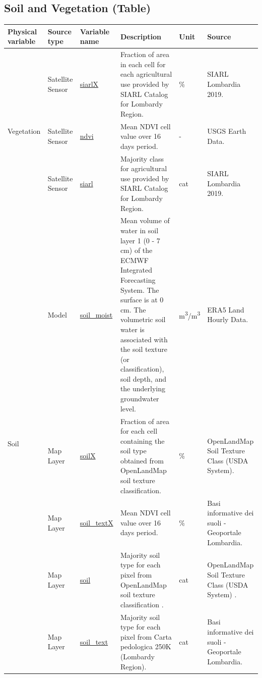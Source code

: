 \subsection{Soil and Vegetation (Table)}

\begin{center}
\setlength{\arrayrulewidth}{1.5pt}
\begin{longtable}{ |p{2cm}|p{1.5cm}|p{2.3cm}|p{4cm}|p{1cm}|p{2cm}| } 
\hline
\textbf{Physical variable} & \textbf{Source type}  & \textbf{Variable name}  & \textbf{Description}  & \textbf{Unit}  & \textbf{Source}\\ 
\hline

\multirow{3}{4em}{Vegetation} & Satellite \newline Sensor  & \underline{siarlX} & Fraction of area in each cell for each agricultural use provided by SIARL Catalog for Lombardy Region.\par & \% & SIARL Lombardia 2019.\\ 
& Satellite \newline Sensor  & \underline{ndvi} &  Mean NDVI cell value over 16 days period.\par & - & USGS Earth Data.\\ 
& Satellite \newline Sensor  & \underline{siarl} &  Majority class for agricultural use provided by SIARL Catalog for Lombardy Region. \par & cat & SIARL Lombardia 2019.\\
\hline

\multirow{5}{4em}{Soil} & Model  & \underline{soil\_moist} & Mean volume of water in soil layer 1 (0 - 7 cm) of the ECMWF Integrated Forecasting System. The surface is at 0 cm. The volumetric soil water is associated with the soil texture (or classification), soil depth, and the underlying groundwater level.\par & m\textsuperscript{3}/m\textsuperscript{3} & ERA5 Land Hourly Data.\\ 
& Map Layer  & \underline{soilX} &  Fraction of area for each cell containing the soil type obtained from OpenLandMap soil texture classification.\par & \% & OpenLandMap Soil Texture Class (USDA System).\\ 
& Map Layer  & \underline{soil\_textX} &  Mean NDVI cell value over 16 days period. \par & \% & Basi informative dei suoli - Geoportale Lombardia.\\ 
& Map Layer  & \underline{soil} &  Majority soil type for each pixel from OpenLandMap soil texture classification .\par & cat & OpenLandMap Soil Texture Class (USDA System) .\\ 
& Map Layer  & \underline{soil\_text} &  Majority soil type for each pixel from Carta pedologica 250K (Lombardy Region). \par& cat & Basi informative dei suoli - Geoportale Lombardia.\\ 


\end{longtable}
\end{center}
